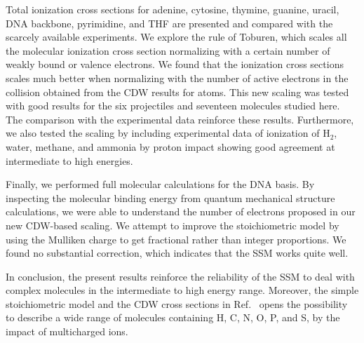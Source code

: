 \documentclass[10pt,showpacs,twocolumn]{revtex4}
\begin{document}
Total ionization cross sections for adenine, cytosine, thymine, guanine, 
uracil, DNA backbone, pyrimidine, and THF are presented and compared 
with the scarcely available experiments. We explore the rule of 
Toburen, which scales all the molecular ionization cross section 
normalizing with a certain number of weakly bound or valence electrons. 
We found that the ionization cross 
sections scales much better when normalizing with the number of active 
electrons in the collision obtained from the CDW results for atoms. 
This new scaling was tested with good results for the six 
projectiles and seventeen molecules studied here. The comparison with 
the experimental data reinforce these results. Furthermore, we also tested
the scaling by including experimental data of ionization of H$_2$, 
water, methane, and ammonia by proton impact showing good agreement at
intermediate to high energies.

Finally, we performed full molecular calculations for the DNA basis. 
By inspecting the molecular binding energy from quantum mechanical
structure calculations, we were able to understand the number of 
electrons proposed in our new CDW-based scaling. We attempt to improve 
the stoichiometric model by using the Mulliken charge to get fractional
rather than integer proportions. We found no substantial correction,
which indicates that the SSM works quite well.

In conclusion, the present results reinforce the 
reliability of the SSM to deal with complex molecules in the intermediate
to high energy range. Moreover, the simple stoichiometric model and the 
CDW cross sections in Ref.~\cite{miraglia2019} opens the possibility to 
describe a wide range of molecules containing H, C, N, O, P, and S, by 
the impact of multicharged ions.


\bigskip
\end{document}
